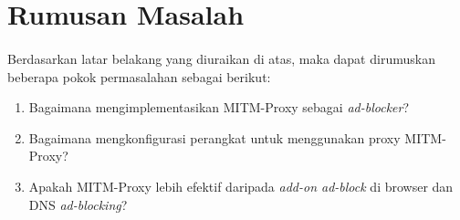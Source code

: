 \documentclass[./bab_1.tex]{subfiles}
\begin{document}
  \section{Rumusan Masalah}
  \paragraph*{}Berdasarkan latar belakang yang diuraikan di
  atas, maka dapat dirumuskan beberapa pokok permasalahan
  sebagai berikut:
  \begin{enumerate}
    \item Bagaimana mengimplementasikan MITM-Proxy sebagai
      \textit{ad-blocker}?
    \item Bagaimana mengkonfigurasi perangkat untuk
      menggunakan proxy MITM-Proxy?
    \item Apakah MITM-Proxy lebih efektif daripada
      \textit{add-on ad-block} di browser dan DNS
      \textit{ad-blocking}?
  \end{enumerate}
\end{document}
